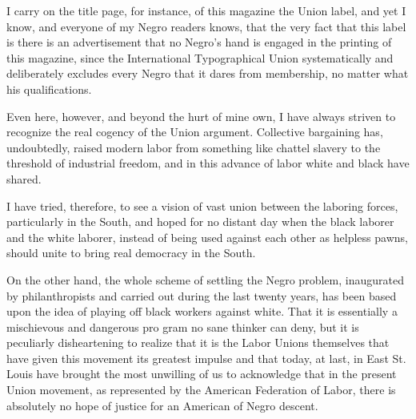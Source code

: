 \documentclass[letterpaper,10pt,english]{jupyterBook}
\begin{document}
\sphinxAtStartPar
I carry on the title page, for instance, of this magazine the Union label, and yet I know, and everyone of my Negro readers knows, that the very fact that this label is there is an advertisement that no Negro’s hand is engaged in the printing of this magazine, since the International Typographical Union systematically and deliberately excludes every Negro that it dares from membership, no matter what his qualifications.

\sphinxAtStartPar
Even here, however, and beyond the hurt of mine own, I have always striven to recognize the real cogency of the Union argument. Collective bargaining has, undoubtedly, raised modern labor from something like chattel slavery to the threshold of industrial freedom, and in this advance of labor white and black have shared.

\sphinxAtStartPar
I have tried, therefore, to see a vision of vast union between the laboring forces, particularly in the South, and hoped for no distant day when the black laborer and the white laborer, instead of being used against each other as helpless pawns, should unite to bring real democracy in the South.

\sphinxAtStartPar
On the other hand, the whole scheme of settling the Negro problem, inaugurated by philanthropists and carried out during the last twenty years, has been based upon the idea of playing off black workers against white. That it is essentially a mischievous and dangerous pro­ gram no sane thinker can deny, but it is peculiarly disheartening to realize that it is the Labor Unions themselves that have given this movement its greatest impulse and that today, at last, in East St. Louis have brought the most unwilling of us to acknowledge that in the present Union movement, as represented by the American Federation of Labor, there is absolutely no hope of justice for an American of Negro descent.
\end{document}
